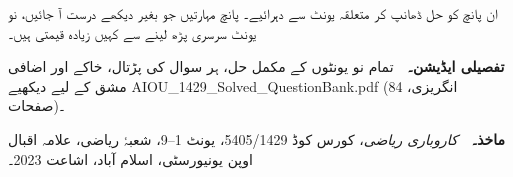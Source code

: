 \medskip
ان پانچ کو حل ڈھانپ کر متعلقہ یونٹ سے دہرائیے۔ پانچ مہارتیں جو بغیر دیکھے درست
آ جائیں، نو یونٹ سرسری پڑھ لینے سے کہیں زیادہ قیمتی ہیں۔

\vfill
\begin{center}
\begin{tcolorbox}[enhanced, colback=bmtint, colframe=bmblue, boxrule=0.5pt,
                  arc=3pt, width=0.92\linewidth,
                  left=12pt, right=12pt, top=10pt, bottom=10pt]
\small
\textbf{\color{bmblue}تفصیلی ایڈیشن۔}\ \
تمام نو یونٹوں کے مکمل حل، ہر سوال کی پڑتال، خاکے اور اضافی مشق کے لیے دیکھیے
\textenglish{AIOU\_1429\_Solved\_QuestionBank.pdf} (انگریزی،
\textenglish{84} صفحات)۔

\medskip
\textbf{\color{bmblue}ماخذ۔}\ \
\emph{کاروباری ریاضی}، کورس کوڈ \textenglish{5405/1429}، یونٹ
\textenglish{1}--\textenglish{9}، شعبۂ ریاضی، علامہ اقبال اوپن یونیورسٹی،
اسلام آباد، اشاعت \textenglish{2023}۔
\end{tcolorbox}
\end{center}
